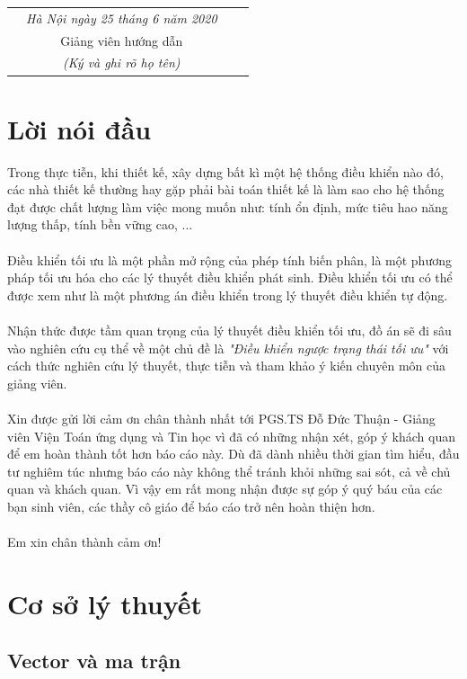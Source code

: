 \documentclass[12pt,a4paper]{report}
\begin{document}
	\begin{flushright}
		\begin{tabular}{cccc}
			&   \textit{ Hà Nội ngày 25 tháng  6 năm 2020} && \\ 
			&    Giảng viên hướng dẫn && \\ 
			&    \textit{(Ký và ghi rõ họ tên)} && \\ 
		\end{tabular} 
	\end{flushright}
	\chapter*{Lời nói đầu}
	Trong thực tiễn, khi thiết kế, xây dựng bất kì một hệ thống điều khiển nào đó, các nhà thiết kế thường hay gặp phải bài toán thiết kế là làm sao cho hệ thống đạt được chất lượng làm việc mong muốn như: tính ổn định, mức tiêu hao năng lượng thấp, tính bền vững cao, ... \\\\ Điều khiển tối ưu là một phần mở rộng của phép tính biến phân, là một phương pháp tối ưu hóa cho các lý thuyết điều khiển phát sinh. Điều khiển tối ưu có thể được xem như là một phương án điều khiển trong lý thuyết điều khiển tự động.
	\\\\ Nhận thức được tầm quan trọng của lý thuyết điều khiển tối ưu, đồ án sẽ đi sâu vào nghiên cứu cụ thể về một chủ đề là \textit{"Điều khiển ngược trạng thái tối ưu"} với cách thức nghiên cứu lý thuyết, thực tiễn và tham khảo ý kiến chuyên môn của giảng viên. \\\\ Xin được gửi lời cảm ơn chân thành nhất tới PGS.TS Đỗ Đức Thuận - Giảng viên Viện Toán ứng dụng và Tin học vì đã có những nhận xét, góp ý khách quan để em hoàn thành tốt hơn báo cáo này. Dù đã dành nhiều thời gian tìm hiểu, đầu tư nghiêm túc nhưng báo cáo này không thể tránh khỏi những sai sót, cả về chủ quan và khách quan. Vì vậy em rất mong nhận được sự góp ý quý báu của các bạn sinh viên, các thầy cô giáo để báo cáo trở nên hoàn thiện hơn.\\\\ Em xin chân thành cảm ơn!
		\tableofcontents
		

	\chapter{Cơ sở lý thuyết}
		\section{Vector và ma trận}
\end{document}
